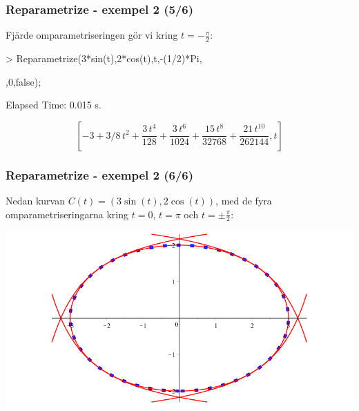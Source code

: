 \documentclass{beamer}
\begin{document}
\begin{frame}
	\frametitle{Reparametrize - exempel 2 (5/6)}
	
	\begin{example}
		Fjärde omparametriseringen gör vi kring $t=-\frac{\pi}{2}$:
		
		\begin{semiverbatim}
			> Reparametrize(3*sin(t),2*cos(t),t,-(1/2)*Pi,
			
			,0,false);
			
			
			Elapsed Time: 0.015 s.
		\end{semiverbatim}
		
		\[\left[-3+3/8\,{t}^{2}+{\frac {3\,{t}^{4}}{128}}+{\frac {3\,{t}^{6}}{1024}}+{\frac {15\,{t}^{8}}{32768}}+{\frac {21\,{t}^{10}}{262144}},t\right]\]
	\end{example}
\end{frame}

\begin{frame}
	\frametitle{Reparametrize - exempel 2 (6/6)}
	
	\begin{example}
		Nedan kurvan $C(t)=(3\sin(t),2\cos(t))$, med de fyra omparametriseringarna kring $t=0$, $t=\pi$ och $t=\pm \frac{\pi}{2}$:
		
		\begin{center}
			\includegraphics[scale=0.35]{Export/kurvorplot2d2.png}
		\end{center}
	\end{example}
\end{frame}
\end{document}

